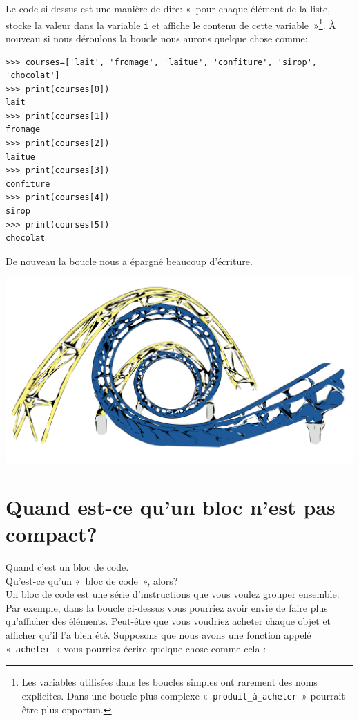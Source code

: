 Le code si dessus est une manière de dire: «~pour chaque élément de la liste, stocke la valeur dans la variable \texttt{i} et affiche le contenu de cette variable~»\footnote{Les variables utilisées dans les boucles simples ont rarement des noms explicites. Dans une boucle plus complexe «~\texttt{produit\_à\_acheter}~» pourrait être plus opportun.}.  À nouveau si nous déroulons la boucle nous aurons quelque chose comme:

\begin{small}
\begin{Verbatim}[frame=single,rulecolor=\color{gray}, label=ne pas saisir]
>>> courses=['lait', 'fromage', 'laitue', 'confiture', 'sirop', 'chocolat']
>>> print(courses[0])
lait
>>> print(courses[1])
fromage
>>> print(courses[2])
laitue
>>> print(courses[3])
confiture
>>> print(courses[4])
sirop
>>> print(courses[5])
chocolat
\end{Verbatim}
\end{small}

De nouveau la boucle nous a épargné beaucoup d'écriture.

\begin{center}
\includegraphics[scale=.2]{images/SteveLambert_Roller_Coaster_Tracks.pdf} 
\end{center}


\section{Quand est-ce qu'un bloc n'est pas compact?}
Quand c'est un bloc de code.\\

Qu'est-ce qu'un «~bloc de code~», alors?\\

Un bloc de code est une série d'instructions que vous voulez grouper ensemble.
Par exemple, dans la boucle ci-dessus vous pourriez avoir envie de faire plus qu'afficher des éléments. 
Peut-être que vous voudriez acheter chaque objet et afficher qu'il l'a bien été.
Supposons que nous avons une fonction appelé «~\texttt{acheter}~» vous pourriez écrire quelque chose comme cela :

